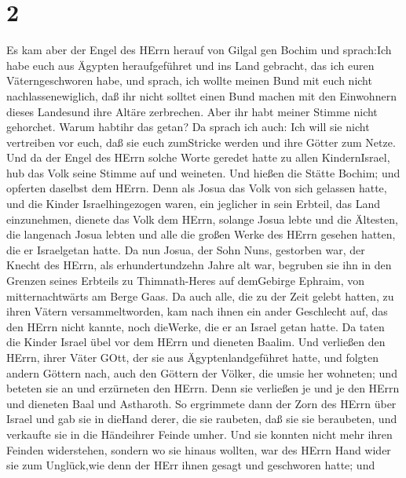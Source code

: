 \hypertarget{section-1}{%
\section{2}\label{section-1}}

 Es kam aber der Engel des HErrn herauf von Gilgal gen
Bochim und sprach:Ich habe euch aus Ägypten heraufgeführet und ins Land
gebracht, das ich euren Väterngeschworen habe, und sprach, ich wollte
meinen Bund mit euch nicht nachlassenewiglich,  daß ihr
nicht solltet einen Bund machen mit den Einwohnern dieses Landesund ihre
Altäre zerbrechen. Aber ihr habt meiner Stimme nicht gehorchet. Warum
habtihr das getan?  Da sprach ich auch: Ich will sie nicht
vertreiben vor euch, daß sie euch zumStricke werden und ihre Götter zum
Netze.  Und da der Engel des HErrn solche Worte geredet
hatte zu allen KindernIsrael, hub das Volk seine Stimme auf und
weineten.  Und hießen die Stätte Bochim; und opferten
daselbst dem HErrn.  Denn als Josua das Volk von sich
gelassen hatte, und die Kinder Israelhingezogen waren, ein jeglicher in
sein Erbteil, das Land einzunehmen,  dienete das Volk dem
HErrn, solange Josua lebte und die Ältesten, die langenach Josua lebten
und alle die großen Werke des HErrn gesehen hatten, die er Israelgetan
hatte.  Da nun Josua, der Sohn Nuns, gestorben war, der
Knecht des HErrn, als erhundertundzehn Jahre alt war, 
begruben sie ihn in den Grenzen seines Erbteils zu Thimnath-Heres auf
demGebirge Ephraim, von mitternachtwärts am Berge Gaas.  Da
auch alle, die zu der Zeit gelebt hatten, zu ihren Vätern
versammeltworden, kam nach ihnen ein ander Geschlecht auf, das den HErrn
nicht kannte, noch dieWerke, die er an Israel getan hatte. 
Da taten die Kinder Israel übel vor dem HErrn und dieneten Baalim.
 Und verließen den HErrn, ihrer Väter GOtt, der sie aus
Ägyptenlandgeführet hatte, und folgten andern Göttern nach, auch den
Göttern der Völker, die umsie her wohneten; und beteten sie an und
erzürneten den HErrn.  Denn sie verließen je und je den
HErrn und dieneten Baal und Astharoth.  So ergrimmete dann
der Zorn des HErrn über Israel und gab sie in dieHand derer, die sie
raubeten, daß sie sie beraubeten, und verkaufte sie in die Händeihrer
Feinde umher. Und sie konnten nicht mehr ihren Feinden widerstehen,
 sondern wo sie hinaus wollten, war des HErrn Hand wider
sie zum Unglück,wie denn der HErr ihnen gesagt und geschworen hatte; und
